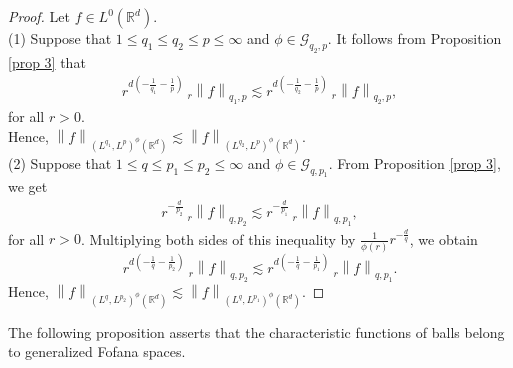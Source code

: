 \documentclass[a4paper,12pt,intlimits,oneside]{amsart}
\numberwithin{equation}{section}
\numberwithin{equation}{section}
\theoremstyle{definition}
\begin{document}
 \begin{proof}
Let $f \in L^{0}(\mathbb{R}^{d})$.\\
(1) Suppose that $1\leq q_{1}\leq q_{2} \leq p \leq\infty$ and $ \phi \in \mathcal{G}_{q_{2},p}$. It follows from Proposition \ref{prop 3} that
\begin{eqnarray*}
r^{d(-\frac{1}{q_{1}}-\frac{1}{p})}\: _{r}\left\|f\right\|_{q_{1},p} \lesssim r^{d(-\frac{1}{q_{2}}-\frac{1}{p})}\: _{r}\left\|f\right\|_{q_{2},p}, 
\end{eqnarray*}
for all $r>0$.\\
Hence, $\left\| f \right\|_{(L^{q_{1}},L^{p})^{\phi }(\mathbb{R}^{d})} \lesssim \left\|f\right\|_{(L^{q_{2}},L^{p})^{\phi }(\mathbb{R}^{d})}.$  \\
(2) Suppose that $1\leq q\leq p_{1} \leq p_{2} \leq\infty$ and $ \phi \in \mathcal{G}_{q,p_{1}}$. From Proposition \ref{prop 3}, we get
\begin{eqnarray*}
r^{-\frac{d}{p_{2}}}\: _{r}\left\|f\right\|_{q,p_{2}} \lesssim r^{-\frac{d}{p_{1}}}\: _{r}\left\|f\right\|_{q,p_{1}}, 
\end{eqnarray*}
for all $r>0$. Multiplying both sides of this inequality by $\frac{1}{\phi(r)} r^{-\frac{d}{q}}$, we obtain 
$$ r^{d(-\frac{1}{q}-\frac{1}{p_{2}})}\: _{r}\left\|f\right\|_{q,p_{2}} \lesssim  r^{d(-\frac{1}{q}-\frac{1}{p_{1}})}\: _{r}\left\|f\right\|_{q,p_{1}}.$$
Hence, $\left\| f \right\|_{(L^{q},L^{p_{2}})^{\phi}(\mathbb{R}^{d})} \lesssim \left\|f\right\|_{(L^{q},L^{p_{1}})^{\phi}(\mathbb{R}^{d})}.$
\end{proof}

The following proposition asserts that the characteristic functions of balls belong to generalized Fofana spaces. 
\end{document}
